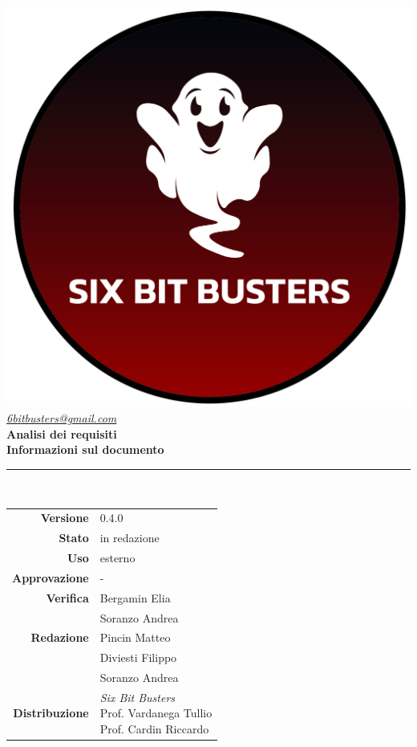 \thispagestyle{empty}
\renewcommand{\arraystretch}{1.3}


\begin{titlepage}
	\begin{center}
		
	\includegraphics[scale = 0.7]{template/images/logo-circle.png}
	\\[1cm]
	\href{mailto:6bitbusters@gmail.com}		      	
	{\large{\textit{6bitbusters@gmail.com} } }\\[1cm]
	
	\Huge \textbf{Analisi dei requisiti} \\[1cm]

	\large \textbf{Informazioni sul documento} \\
	\rule{0.6\textwidth}{0.4pt}
	\\[0.5cm]
	\begin{tabular}{r|l}
		\textbf{Versione} & 0.4.0\\
		\textbf{Stato} & in redazione\\
		\textbf{Uso} & esterno\\                         
		\textbf{Approvazione} & -\\                      
		\textbf{Verifica} & Bergamin Elia\\ & Soranzo Andrea \\                       
		\textbf{Redazione} & Pincin Matteo\\ & Diviesti Filippo\\ & Soranzo Andrea \\  
		\textbf{Distribuzione} & \parbox[t]{5cm}{ \textit{Six Bit Busters} \\ Prof. Vardanega Tullio 
	 \\ Prof. Cardin Riccardo}
	\end{tabular}	
	\\[1.2cm]


\end{center}
\end{titlepage}
